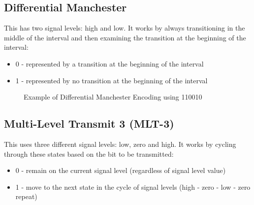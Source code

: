 \subsection{Differential Manchester}
This has two signal levels: high and low. It works by always transitioning in the middle of the interval and then examining the transition at the beginning of the interval:
\begin{itemize}
    \item 0 - represented by a transition at the beginning of the interval
    \item 1 - represented by no transition at the beginning of the interval
\end{itemize}

\begin{figure}[H]
\centering
{}
\caption{Example of Differential Manchester Encoding using 110010}
\end{figure}

\subsection{Multi-Level Transmit 3 (MLT-3)}
This uses three different signal levels: low, zero and high. It works by cycling through these states based on the bit to be transmitted:
\begin{itemize}
    \item 0 - remain on the current signal level (regardless of signal level value)
    \item 1 - move to the next state in the cycle of signal levels (high - zero - low - zero repeat)
\end{itemize}

